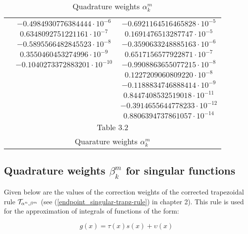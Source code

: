 \documentclass[../document.tex]{subfiles}
\begin{document}
\begin{table}[h]
{\begin{tabular}{ | c || c || c | }
				&	$-0.4984930776384444\cdot 10^{-6}$		&	$-0.6921164516465828\cdot 10^{-5}$	\\
				&	$0.6348092751221161\cdot 10^{-7}$		&	$0.1691476513287747\cdot 10^{-5}$	\\
				&	$-0.5895566482845523\cdot 10^{-8}$		&	$-0.3590633248885163\cdot 10^{-6}$	\\
				&	$0.3550460453274996\cdot 10^{-9}$		&	$0.6517156577922871\cdot 10^{-7}$	\\
				&	$-0.1040273372883201\cdot 10^{-10}$		&	$-0.9908863655077215\cdot 10^{-8}$	\\
				&                                &	$0.1227209060809220\cdot 10^{-8}$	\\
				&                                &	$-0.1188834746888414\cdot 10^{-9}$	\\
				&                                &	$0.8447408532519018\cdot 10^{-11}$	\\
				&                                &	$-0.3914655644778233\cdot 10^{-12}$	\\
				&                                &	$0.8806394737861057\cdot 10^{-14}$	\\
				\hline
				\hline
				
				\multicolumn{3}{|c|}{		Table 3.2                     }\\
				\multicolumn{3}{|c|}{	Quarature weights $\alpha_{k}^m$  }\\
				
				\hline
		\end{tabular}}
		\caption{ Quadrature weights $\alpha_{k}^m$ }	
		
	\end{table}
	
	
	
	\subsection{Quadrature weights $\beta_{k}^m$ for singular functions}
	
	
	Given below are the values of the correction weights of the corrected trapezoidal rule $\mathcal{T}_{\alpha^n,\beta^m}$ (see (\ref*{endpoint_singular-trapz-rule}) in chapter 2). 
	This rule is used for the approximation of integrals of functions of the form:
	
	\begin{equation} 
		g(x) = 	\tau(x)s(x) + \upsilon(x)
	\end{equation}
	
\end{document}
